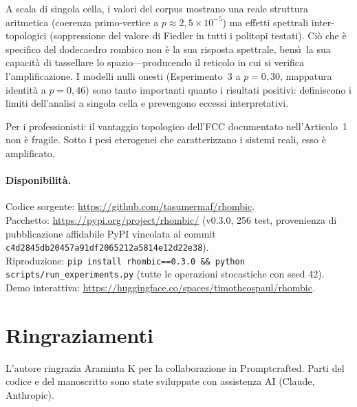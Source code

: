 \documentclass[11pt]{article}
\begin{document}
A scala di singola cella, i valori del corpus mostrano una reale
struttura aritmetica (coerenza primo-vertice a
$p \approx 2{,}5 \times 10^{-5}$) ma effetti spettrali
inter-topologici (soppressione del valore di Fiedler in tutti i
politopi testati). Ci\`o che \`e specifico del dodecaedro rombico non
\`e la sua risposta spettrale, bens\`\i\ la sua capacit\`a di
tassellare lo spazio---producendo il reticolo in cui si verifica
l'amplificazione. I modelli nulli onesti (Esperimento~3 a
$p = 0{,}30$, mappatura identit\`a a $p = 0{,}46$) sono tanto
importanti quanto i risultati positivi: definiscono i limiti
dell'analisi a singola cella e prevengono eccessi interpretativi.

Per i professionisti: il vantaggio topologico dell'FCC documentato
nell'Articolo~1 non \`e fragile. Sotto i pesi eterogenei che
caratterizzano i sistemi reali, esso \`e amplificato.

\paragraph{Disponibilit\`a.}
Codice sorgente: \url{https://github.com/tasumermaf/rhombic}.\\
Pacchetto: \url{https://pypi.org/project/rhombic/} (v0.3.0, 256 test,
provenienza di pubblicazione affidabile PyPI vincolata al commit
\texttt{c4d2845db20457a91df2065212a5814e12d22e38}).\\
Riproduzione: \texttt{pip install rhombic==0.3.0 \&\& python
scripts/run\_experiments.py} (tutte le operazioni stocastiche con seed 42).\\
Demo interattiva: \url{https://huggingface.co/spaces/timotheospaul/rhombic}.

\section*{Ringraziamenti}

L'autore ringrazia Araminta K per la collaborazione in Promptcrafted.
Parti del codice e del manoscritto sono state sviluppate con assistenza
AI (Claude, Anthropic).



\end{document}
